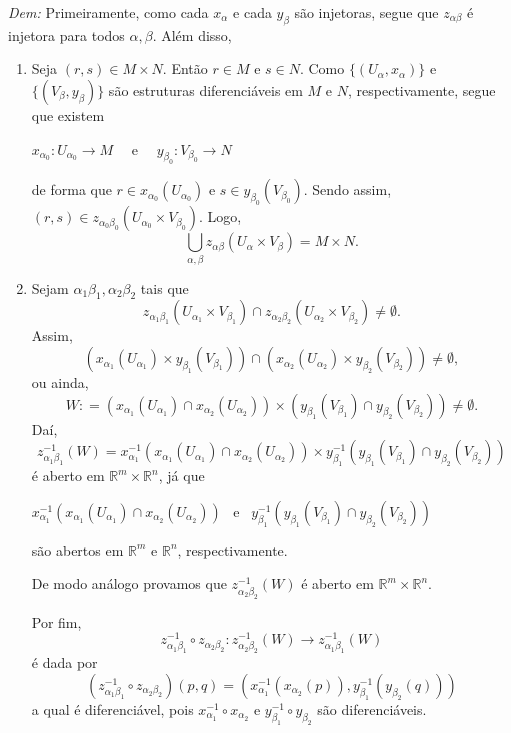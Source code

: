 \documentclass[twoside,openright,titlepage,numbers=noenddot,headinclude,  lineheaders footinclude=true,cleardoublepage=empty,BCOR=5mm,paper=a4,fontsize=12pt ]{scrbook}
\newcommand{\R}{\mathbb R}
\begin{document}
\noindent\textit{Dem:} Primeiramente, como cada $x_{\alpha}$ e cada $y_{\beta}$ são injetoras, segue que $z_{\alpha \beta}$ é injetora para todos $\alpha, \beta$. Além disso, 
\begin{enumerate}
\item Seja $(r, s) \in M \times N$. Então $r \in M$ e $s \in N$. 
Como $\lbrace (U_{\alpha}, x_{\alpha}) \rbrace$ e $\lbrace (V_{\beta}, y_{\beta}) \rbrace$ são estruturas diferenciáveis em $M$ e $N$, respectivamente, segue que existem
\begin{center}
    $x_{\alpha _0} : U_{\alpha _0} \rightarrow M$ \ \ e \ \ $y_{\beta _0} : V_{\beta _0} \rightarrow N $ 
\end{center}
de forma que $r \in x_{\alpha _0} (U_{\alpha _0})$ e $s \in y_{\beta _0} (V_{\beta _0})$.
Sendo assim, $(r, s) \in z_{\alpha _0 \beta _0}(U_{\alpha _0} \times V_{\beta _0})$. 
Logo, 
$$ \bigcup _{\alpha, \beta} z_{\alpha \beta} (U_{\alpha} \times V_{\beta}) = M \times N .$$

\item Sejam $\alpha _1 \beta _1, \alpha _2 \beta _2$ tais que 
$$ z_{\alpha _1 \beta _1}(U_{\alpha _1} \times V_{\beta _1}) \cap z_{\alpha _2 \beta _2} (U_{\alpha _2} \times V_{\beta _2}) \neq \emptyset .$$
Assim, 
$$ \left( x_{\alpha _1} (U_{\alpha _1}) \times y_{\beta _1} (V_{\beta _1}) \right) \cap \left( x_{\alpha _2} (U_{\alpha _2}) \times y_{\beta _2} (V_{\beta _2}) \right) \neq \emptyset ,$$
ou ainda, 
$$ W : = \left( x_{\alpha _1} (U _{\alpha _1}) \cap x_{\alpha _2} (U_{\alpha _2}) \right) \times \left( y_{\beta _1}(V_{\beta _1}) \cap y_{\beta _2}(V_{\beta _2}) \right) \neq \emptyset .$$
Daí, $$ z_{\alpha _1 \beta _1}^{-1}(W) = x_{\alpha _1}^{-1}(x_{\alpha _1} (U _{\alpha _1}) \cap x_{\alpha _2} (U_{\alpha _2})) \times y_{\beta _1}^{-1}(y_{\beta _1}(V_{\beta _1}) \cap y_{\beta _2}(V_{\beta _2})) $$
é aberto em $\R ^m \times \R ^n$, já que 
\begin{center}
    $x_{\alpha _1}^{-1}(x_{\alpha _1} (U _{\alpha _1}) \cap x_{\alpha _2} (U_{\alpha _2}))$ \ e \ $ y_{\beta _1}^{-1}(y_{\beta _1}(V_{\beta _1}) \cap y_{\beta _2}(V_{\beta _2})) $
\end{center}
são abertos em $\R ^m$ e $\R ^n$, respectivamente.

De modo análogo provamos que $z_{\alpha _2 \beta _2} ^{-1}(W)$ é aberto em $\R ^m \times \R ^n$.

Por fim, 
$$ z_{\alpha _1 \beta _1}^{-1} \circ z_{\alpha _2 \beta _2} : z_{\alpha _2 \beta _2} ^{-1}(W) \rightarrow z_{\alpha _1 \beta _1}^{-1}(W) $$ 
é dada por 
$$ (z_{\alpha _1 \beta _1}^{-1} \circ z_{\alpha _2 \beta _2})(p, q) = (x_{\alpha _1}^{-1} (x_{\alpha _2} (p)), y_{\beta _1}^{-1} (y_{\beta _2}(q))) $$
a qual é diferenciável, pois $x_{\alpha _1}^{-1} \circ x_{\alpha _2}$ e $y_{\beta _1}^{-1} \circ y _{\beta _2}$ são diferenciáveis.
\end{enumerate}
\end{document}

